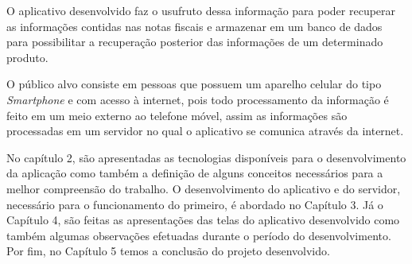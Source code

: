 O aplicativo desenvolvido faz o usufruto dessa informação para poder recuperar as informações contidas nas notas fiscais e armazenar em um banco de dados para possibilitar a recuperação posterior das informações de um determinado produto.


O público alvo consiste em pessoas que possuem um aparelho celular do tipo \textit{Smartphone} e com acesso à internet, pois todo processamento da informação é feito em um meio externo ao telefone móvel, assim as informações são processadas em um servidor no qual o aplicativo se comunica através da internet.

No capítulo 2, são apresentadas as tecnologias disponíveis para o desenvolvimento da aplicação como também a definição de alguns conceitos necessários para a melhor compreensão do trabalho. O desenvolvimento do aplicativo e do servidor, necessário para o funcionamento do primeiro, é abordado no Capítulo 3. Já o Capítulo 4, são feitas as apresentações das telas do aplicativo desenvolvido como também algumas observações efetuadas durante o período do desenvolvimento. Por fim, no Capítulo 5 temos a conclusão do projeto desenvolvido.
